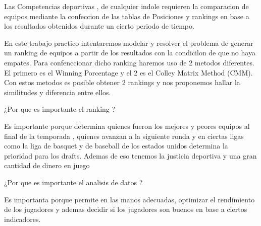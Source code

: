 Las Competencias deportivas , de cualquier indole requieren la comparacion de equipos
mediante la confeccion de las tablas de Posiciones y rankings en base a los resultados obtenidos
durante un cierto periodo de tiempo.


En este trabajo practico intentaremos modelar y 
resolver el problema de generar un ranking de equipos a partir de los 
resultados con la condicilon de que no haya empates. 
Para confenccionar dicho ranking haremos uso de 2 metodos diferentes.
El primero es el Winning Porcentage y el 2 es el Colley Matrix Method (CMM).
Con estos metodos es posible obtener 2 rankings y nos proponemos hallar
la similitudes y diferencia entre ellos.

¿Por que es importante el ranking ?

Es importante porque determina quienes fueron los mejores y peores equipos al final
de la temporada , quienes avanzan a la siguiente ronda y en ciertas
ligas como la liga de basquet y de baseball de los estados unidos 
determina la prioridad para los drafts.
Ademas de eso tenemos la justicia deportiva y una gran cantidad de dinero en juego

¿Por que es importante el analisis de datos ?

Es importanta porque permite en las manos adecuadas, optimizar el
rendimiento de los jugadores y ademas decidir si los jugadores son buenos en base a ciertos 
indicadores.







